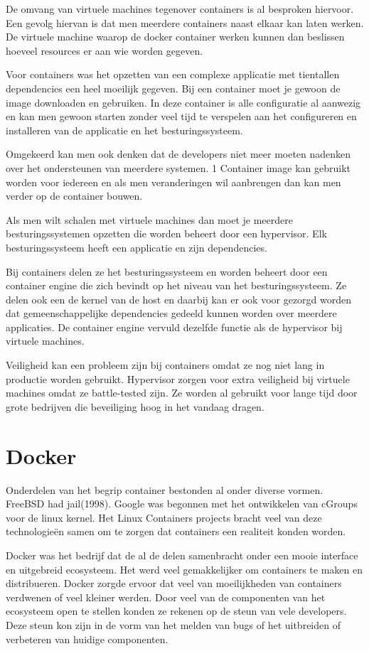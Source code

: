 \documentclass[pdftex,a4paper,12pt,twoside]{report}
\begin{document}
De omvang van virtuele machines tegenover containers is al besproken hiervoor. Een gevolg hiervan is dat men meerdere containers naast elkaar kan laten werken. De virtuele machine waarop de docker container werken kunnen dan beslissen hoeveel resources er aan wie worden gegeven.

Voor containers was het opzetten van een complexe applicatie met tientallen dependencies een heel moeilijk gegeven. Bij een container moet je gewoon de image downloaden en gebruiken. In deze container is alle configuratie al aanwezig en kan men gewoon starten zonder veel tijd te verspelen aan het configureren en installeren van de applicatie en het besturingssysteem.

Omgekeerd kan men ook denken dat de developers niet meer moeten nadenken over het ondersteunen van meerdere systemen. 1 Container image kan gebruikt worden voor iedereen en als men veranderingen wil aanbrengen dan kan men verder op de container bouwen. 

Als men wilt schalen met virtuele machines dan moet je meerdere besturingssystemen opzetten die worden beheert door een hypervisor. Elk besturingssysteem heeft een applicatie en zijn dependencies.

Bij containers delen ze het besturingssysteem en worden beheert door een container engine die zich bevindt op het niveau van het besturingssysteem. Ze delen ook een de kernel van de host en daarbij kan er ook voor gezorgd worden dat gemeenschappelijke dependencies gedeeld kunnen worden over meerdere applicaties. De container engine vervuld dezelfde functie als de hypervisor bij virtuele machines. 

Veiligheid kan een probleem zijn bij containers omdat ze nog niet lang in productie worden gebruikt. Hypervisor zorgen voor extra veiligheid bij virtuele machines omdat ze battle-tested zijn. Ze worden al gebruikt voor lange tijd door grote bedrijven die beveiliging hoog in het vandaag dragen.

\section{Docker}

Onderdelen van het begrip container bestonden al onder diverse vormen. FreeBSD had jail(1998). Google was begonnen met het ontwikkelen van cGroups voor de linux kernel. Het Linux Containers projects bracht veel van deze technologieën samen om te zorgen dat containers een realiteit konden worden.

Docker was het bedrijf dat de al de delen samenbracht onder een mooie interface en uitgebreid ecosysteem. Het werd veel gemakkelijker om containers te maken en distribueren. Docker zorgde ervoor dat veel van moeilijkheden van containers verdwenen of veel kleiner werden. Door veel van de componenten van het ecosysteem open te stellen konden ze rekenen op de steun van vele developers. Deze steun kon zijn in de vorm van het melden van bugs of het uitbreiden of verbeteren van huidige componenten. 
\end{document}
